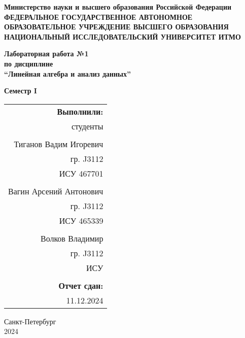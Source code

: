 \documentclass[14pt]{extarticle}
\begin{document}
\thispagestyle{empty}
\begin{titlepage}
	\begin{center}
		\textbf{Министерство науки и высшего образования Российской Федерации}\\
		\textbf{ФЕДЕРАЛЬНОЕ ГОСУДАРСТВЕННОЕ АВТОНОМНОЕ ОБРАЗОВАТЕЛЬНОЕ УЧРЕЖДЕНИЕ ВЫСШЕГО ОБРАЗОВАНИЯ НАЦИОНАЛЬНЫЙ ИССЛЕДОВАТЕЛЬСКИЙ УНИВЕРСИТЕТ ИТМО}
	\end{center}
	
	\vspace{2cm}
	
	\begin{center}
		\textbf{\Large Лабораторная работа №1}\\
		\textbf{\Large по дисциплине}\\
		\textbf{\Large “Линейная алгебра и анализ данных”}
	\end{center}
	
	\vspace{1cm}
	
	\begin{center}
		\textbf{\Large Семестр I}
	\end{center}
	
	\vspace{2cm}
	
	\begin{flushright}
		\begin{tabular}{r}
			\textbf{Выполнили:} \\
			студенты \\
			\\
			Тиганов Вадим Игоревич \\
			гр. J3112 \\
			ИСУ 467701 \\
			\\
			Вагин Арсений Антонович\\
			гр. J3112 \\
			ИСУ 465339\\
			\\
			Волков Владимир \\
			гр. J3112 \\
			ИСУ \\
			\\
			\textbf{Отчет сдан:} \\
			11.12.2024
		\end{tabular}
	\end{flushright}
	
	\vspace{2cm}
	
	\begin{center}
		Санкт-Петербург \\
		2024
	\end{center}
\end{titlepage}
\end{document}

